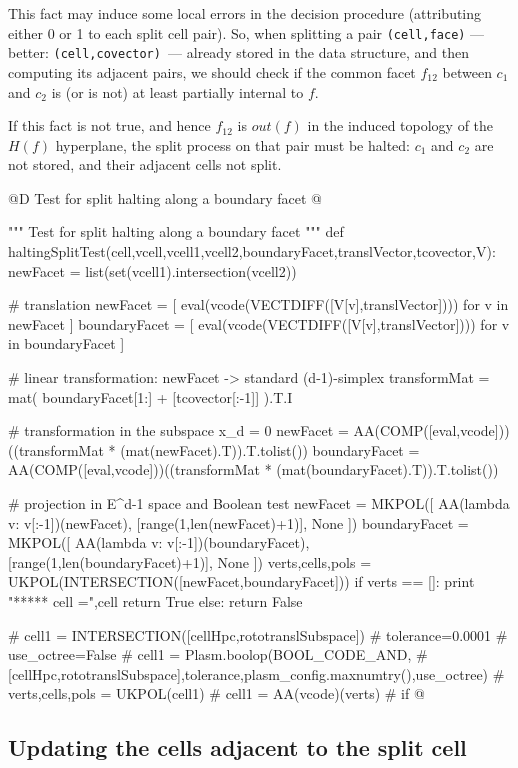\documentclass[11pt,oneside]{article}	%
\begin{document}
This fact may induce some local errors in the decision procedure (attributing either 0 or 1 to each split cell pair).
So, when splitting a pair \texttt{(cell,face)} --- better: \texttt{(cell,covector) }--- already stored in the data structure, and then computing its adjacent  pairs,
we should check if the common facet $f_{12}$ between $c_1$ and $c_2$ is (or is not) at least partially internal  to $f$.  

If this fact is not true, and hence $f_{12}$ is $out(f)$  in the induced topology of the $H(f)$ hyperplane, the split process on that pair must be halted:  $c_1$ and $c_2$ are not stored, and their adjacent cells not split.


@D Test for split halting along a boundary facet
@{""" Test for split halting along a boundary facet """
def haltingSplitTest(cell,vcell,vcell1,vcell2,boundaryFacet,translVector,tcovector,V):
	newFacet = list(set(vcell1).intersection(vcell2))
	
	# translation 
	newFacet = [ eval(vcode(VECTDIFF([V[v],translVector]))) for v in newFacet ]
	boundaryFacet = [ eval(vcode(VECTDIFF([V[v],translVector]))) for v in boundaryFacet ]
	
	# linear transformation: newFacet -> standard (d-1)-simplex
	transformMat = mat( boundaryFacet[1:] + [tcovector[:-1]] ).T.I
	
	# transformation in the subspace x_d = 0
	newFacet = AA(COMP([eval,vcode]))((transformMat * (mat(newFacet).T)).T.tolist())
	boundaryFacet = AA(COMP([eval,vcode]))((transformMat * (mat(boundaryFacet).T)).T.tolist())
	
	# projection in E^{d-1} space and Boolean test
	newFacet = MKPOL([ AA(lambda v: v[:-1])(newFacet), [range(1,len(newFacet)+1)], None ])
	boundaryFacet = MKPOL([ AA(lambda v: v[:-1])(boundaryFacet), [range(1,len(boundaryFacet)+1)], None ])
	verts,cells,pols = UKPOL(INTERSECTION([newFacet,boundaryFacet]))
	if verts == []: 
		print "\n****** cell =",cell
		return True
	else: return False

# cell1 = INTERSECTION([cellHpc,rototranslSubspace])
# tolerance=0.0001
# use_octree=False
# cell1 = Plasm.boolop(BOOL_CODE_AND, 
# 	[cellHpc,rototranslSubspace],tolerance,plasm_config.maxnumtry(),use_octree)
# verts,cells,pols = UKPOL(cell1)
# cell1 = AA(vcode)(verts)
# if 
@}



\subsection{Updating the cells adjacent to the split cell}
\end{document}
